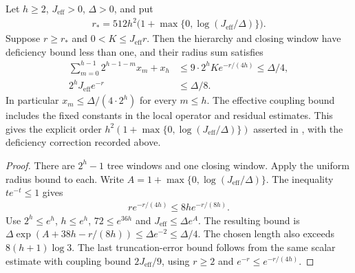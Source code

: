 \begin{lemma}
    \label{thm:hastings05_explicit_projection_length}
    \leanok
    Let $h\ge2$, $J_{\mathrm{eff}}>0$, $\Delta>0$, and put
    \begin{align*}
        r_* =512h^2\bigl(1+\max\{0,\log(J_{\mathrm{eff}}/\Delta)\}\bigr).
    \end{align*}
    Suppose $r\ge r_*$ and $0<K\le J_{\mathrm{eff}}r$. Then the hierarchy
    and closing window have deficiency bound less than one, and their
    radius sum satisfies
    \begin{align*}
        \sum_{m=0}^{h-1}2^{h-1-m}x_m+x_h
                                  & \le9\cdot2^hK e^{-r/(4h)}\le\Delta/4, \\
        2^hJ_{\mathrm{eff}}e^{-r} & \le\Delta/8.
    \end{align*}
    In particular $x_m\le\Delta/(4\cdot2^h)$ for every $m\le h$.
    The effective coupling bound includes the fixed constants in the
    local operator and residual estimates. This gives the explicit
    order $h^2(1+\max\{0,\log(J_{\mathrm{eff}}/\Delta)\})$ asserted in
    \cite[lines 709--720]{Hastings2006Solving}, with the deficiency correction
    recorded above.
\end{lemma}
\begin{proof}\leanok
    There are $2^h-1$ tree windows and one closing window. Apply the
    uniform radius bound to each. Write
    $A=1+\max\{0,\log(J_{\mathrm{eff}}/\Delta)\}$.
    The inequality $t e^{-t}\le1$ gives
    \begin{align*}
        r e^{-r/(4h)}\le8h e^{-r/(8h)}.
    \end{align*}
    Use $2^h\le e^h$, $h\le e^h$, $72\le e^{36h}$ and
    $J_{\mathrm{eff}}\le\Delta e^A$. The resulting bound is
    $\Delta\exp(A+38h-r/(8h))\le\Delta e^{-2}\le\Delta/4$.
    The chosen length also exceeds $8(h+1)\log3$.
    The last truncation-error bound follows from the same scalar estimate
    with coupling bound $2J_{\mathrm{eff}}/9$, using $r\ge2$ and
    $e^{-r}\le e^{-r/(4h)}$.
\end{proof}

